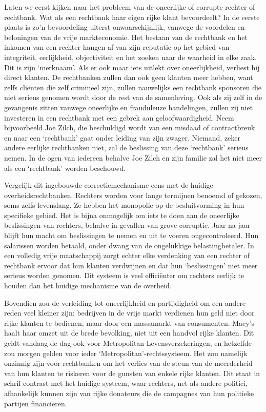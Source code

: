 \documentclass[
  a5paper,
  smalldemyvopaper,10pt,twoside,onecolumn,openright,extrafontsizes,hidelinks]{memoir}
\begin{document}
Laten we eerst kijken naar het probleem van de oneerlijke of corrupte
rechter of rechtbank. Wat als een rechtbank haar eigen rijke klant
bevoordeelt? In de eerste plaats is zo'n bevoordeling uiterst
onwaarschijnlijk, vanwege de voordelen en beloningen van de vrije
markteconomie. Het bestaan van de rechtbank en het inkomen van een
rechter hangen af van zijn reputatie op het gebied van integriteit,
eerlijkheid, objectiviteit en het zoeken naar de waarheid in elke zaak.
Dit is zijn `merknaam'. Als er ook maar iets uitlekt over oneerlijkheid,
verliest hij direct klanten. De rechtbanken zullen dan ook geen klanten
meer hebben, want zelfs cliënten die zelf crimineel zijn, zullen
nauwelijks een rechtbank sponsoren die niet serieus genomen wordt door
de rest van de samenleving. Ook als zij zelf in de gevangenis zitten
vanwege oneerlijke en frauduleuze handelingen, zullen zij niet
investeren in een rechtbank met een gebrek aan geloofwaardigheid. Neem
bijvoorbeeld Joe Zilch, die beschuldigd wordt van een misdaad of
contractbreuk en naar een `rechtbank' gaat onder leiding van zijn
zwager. Niemand, zeker andere eerlijke rechtbanken niet, zal de
beslissing van deze `rechtbank' serieus nemen. In de ogen van iedereen
behalve Joe Zilch en zijn familie zal het niet meer als een `rechtbank'
worden beschouwd.

Vergelijk dit ingebouwde correctiemechanisme eens met de huidige
overheidsrechtbanken. Rechters worden voor lange termijnen benoemd of
gekozen, soms zelfs levenslang. Ze hebben het monopolie op de
besluitvorming in hun specifieke gebied. Het is bijna onmogelijk om iets
te doen aan de oneerlijke beslissingen van rechters, behalve in gevallen
van grove corruptie. Jaar na jaar blijft hun macht om beslissingen te
nemen en uit te voeren ongecontroleerd. Hun salarissen worden betaald,
onder dwang van de ongelukkige belastingbetaler. In een volledig vrije
maatschappij zorgt echter elke verdenking van een rechter of rechtbank
ervoor dat hun klanten verdwijnen en dat hun `beslissingen' niet meer
serieus worden genomen. Dit systeem is veel efficiënter om rechters
eerlijk te houden dan het huidige mechanisme van de overheid.

Bovendien zou de verleiding tot oneerlijkheid en partijdigheid om een
andere reden veel kleiner zijn: bedrijven in de vrije markt verdienen
hun geld niet door rijke klanten te bedienen, maar door een massamarkt
van consumenten. Macy's haalt haar omzet uit de brede bevolking, niet
uit een handvol rijke klanten. Dit geldt vandaag de dag ook voor
Metropolitan Levensverzekeringen, en hetzelfde zou morgen gelden voor
ieder `Metropolitan'-rechtssysteem. Het zou namelijk onzinnig zijn voor
rechtbanken om het verlies van de steun van de meerderheid van hun
klanten te riskeren voor de gunsten van enkele rijke klanten. Dit staat
in schril contrast met het huidige systeem, waar rechters, net als
andere politici, afhankelijk kunnen zijn van rijke donateurs die de
campagnes van hun politieke partijen financieren.
\end{document}
